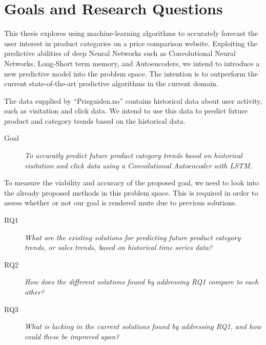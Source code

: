 \section{Goals and Research Questions}
\label{section:Introduction:Goal}


This thesis explores using machine-learning algorithms to accurately forecast the user interest in product categories on a price comparison website.
Exploiting the predictive abilities of deep Neural Networks such as Convolutional Neural Networks, Long-Short term memory, and Autoencoders,
we intend to introduce a new predictive model into the problem space.
The intention is to outperform the current state-of-the-art predictive algorithms in the current domain.

The data supplied by ``Prisguiden.no'' contains historical data about user activity, such as visitation and click data.
We intend to use this data to predict future product and category trends based on the historical data.

\begin{description}
  \item[Goal]{\it To accuratly predict future product category trends based on historical visitation and click data using a Convolutional Autoencoder with LSTM.}
\end{description}

To measure the viability and accuracy of the proposed goal, we need to look into the already proposed methods in this problem space.
This is required in order to assess whether or not our goal is rendered mute due to previous solutions.

\begin{description}
  \item[RQ1]{\it What are the existing solutions for predicting future product category trends, or sales trends, based on historical time series data?}
\end{description}

\begin{description}
  \item[RQ2]{\it How does the different solutions found by addressing RQ1 compare to each other?}
\end{description}

\begin{description}
  \item[RQ3]{\it What is lacking in the current solutions found by addressing RQ1, and how could these be improved upon?}
\end{description}

